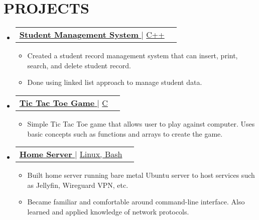 \documentclass[letterpaper,11pt]{article}
\makeatletter
\newcommand{\resumeItem}[1]{
  \item\small{
    {#1 \vspace{-2pt}}
  }
}
\newcommand{\resumeProjectHeading}[2]{
    \item
    \begin{tabular*}{1.001\textwidth}{l@{\extracolsep{\fill}}r}
      \small#1 & \textbf{\small #2}\\
    \end{tabular*}\vspace{-7pt}
}
\newcommand{\resumeSubHeadingListStart}{\begin{itemize}[leftmargin=0.0in, label={}]}
\newcommand{\resumeSubHeadingListEnd}{\end{itemize}}
\newcommand{\resumeItemListStart}{\begin{itemize}}
\newcommand{\resumeItemListEnd}{\end{itemize}\vspace{-5pt}}
\makeatother
\begin{document}
\section{PROJECTS}
    \resumeSubHeadingListStart
       \resumeProjectHeading
          {\href{https://github.com/jamesyoung-15/cpp_practice/tree/main/Student_Management}{\textbf{\large{\underline{Student Management System}}} \href{Project Link}{\raisebox{-0.1\height}\faExternalLink }} $|$ \large{\underline{C++}}}{}
          \resumeItemListStart
          \vspace{3pt}
            \resumeItem{\normalsize{Created a student record management system that can insert, print, search, and delete student record.}}
            \resumeItem{\normalsize{Done using linked list approach to manage student data.}}
          \resumeItemListEnd 
          
      \resumeProjectHeading
          {\href{https://github.com/jamesyoung-15/C_Practice/tree/main/Practice_Projects/tic_tac_toe}{\textbf{\large{\underline{Tic Tac Toe Game}}} \href{Project Link}{\raisebox{-0.1\height}\faExternalLink }} $|$ \large{\underline{C}}}{}
          \resumeItemListStart
          \vspace{3pt}
            \resumeItem{\normalsize{Simple Tic Tac Toe game that allows user to play against computer. Uses basic concepts such as functions and arrays to create the game.}}
          \resumeItemListEnd
          
      \resumeProjectHeading
          {\href{https://github.com/jamesyoung-15/homeserver}{\textbf{\large{\underline{Home Server}}} \href{Project Link}{\raisebox{-0.1\height}\faExternalLink }} $|$ \large{\underline{Linux, Bash}}}{}
          \resumeItemListStart
          \vspace{3pt}
            \resumeItem{\normalsize{Built home server running bare metal Ubuntu server to host services such as Jellyfin, Wireguard VPN, etc.}}
            \resumeItem{\normalsize{Became familiar and comfortable around command-line interface. Also learned and applied knowledge of network protocols.}}
          \resumeItemListEnd
          
          \resumeSubHeadingListEnd
\vspace{3pt}

%


\end{document}

